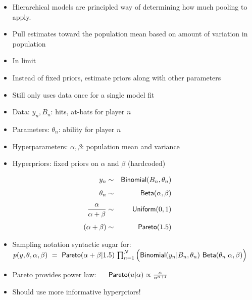 \documentclass[10pt]{report}
\begin{document}
\begin{itemize}
\item Hierarchical models are principled way of determining how much
  pooling to apply.
\item Pull estimates toward the population mean based on amount of
  variation in population
\item In limit
\end{itemize}

\begin{itemize}
\item Instead of fixed priors, estimate priors along with other parameters
\item Still only uses data once for a single model fit
\item Data: $y_n, B_n$: hits, at-bats for player $n$
\item Parameters: $\theta_n$: ability for player $n$
\item Hyperparameters: $\alpha, \beta$: population mean and variance
\item Hyperpriors: fixed priors on $\alpha$ and $\beta$ (hardcoded)
\end{itemize}

\vspace*{-4pt}
\begin{eqnarray*}
y_n & \sim & \text{\sf Binomial}(B_n, \theta_n)
\\[4pt]
\theta_n & \sim & \text{\sf Beta}(\alpha,\beta)
\\[4pt]
\frac{\alpha}{\alpha + \beta} & \sim & \text{\sf Uniform}(0,1)
\\[4pt]
(\alpha + \beta) & \sim & \text{\sf Pareto}(1.5)
\end{eqnarray*}
\begin{itemize}
\item Sampling notation syntactic sugar for: \\[4pt]
{\footnotesize 
$
p(y,\theta,\alpha,\beta)
\ = \
\text{\sf Pareto}(\alpha + \beta | 1.5)
\,
\prod_{n=1}^N 
  \Big(
  \text{\sf Binomial}(y_n|B_n, \theta_n)
  \
  \text{\sf Beta}(\theta_n|\alpha,\beta) 
  \Big)
$
}
\item Pareto provides power law: \ \
{\small 
$
\text{\sf Pareto}(u|\alpha) \propto
\frac{\alpha}{u^{\alpha + 1}}
$
}
\item Should use more informative hyperpriors!
\end{itemize}
\end{document}
